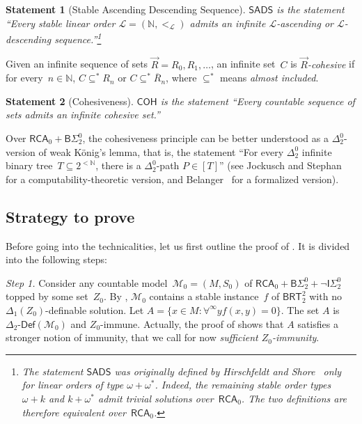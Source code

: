 \documentclass{article}
\def\L{\mathcal{L}}
\def\M{\mathcal{M}}
\newcommand{\ISig}{\mathsf{I}\Sigma^0}
\newcommand{\BSig}{\mathsf{B}\Sigma^0}
\newcommand{\RCA}[0]{\mathsf{RCA}}
\newcommand{\SADS}[0]{\mathsf{SADS}}
\newcommand{\COH}[0]{\mathsf{COH}}
\newcommand{\BRT}[0]{\mathsf{BRT}}
\newcommand{\NN}[0]{\mathbb{N}}
\newcommand{\Definable}[2]{#1\mbox{-}\mathsf{Def}(#2)}
\def\qt#1{``#1''}%
\newtheorem*{statement}{Statement}
\numberwithin{theorem}{section}
\begin{document}
\begin{statement}[Stable Ascending Descending Sequence]
$\SADS$ is the statement \qt{Every stable linear order $\L = (\NN, <_\L)$ admits an infinite $\L$-ascending or $\L$-descending sequence.}\footnote{The statement $\SADS$ was originally defined by Hirschfeldt and Shore~\cite{hirschfeldt_combinatorial_2007} only for linear orders of type $\omega+\omega^*$. Indeed, the remaining stable order types $\omega+k$ and $k+\omega^*$ admit trivial solutions over~$\RCA_0$. The two definitions are therefore equivalent over~$\RCA_0$.}
\end{statement}

Given an infinite sequence of sets $\vec{R} = R_0, R_1, \dots$, an infinite set~$C$ is \emph{$\vec{R}$-cohesive}
if for every~$n \in \NN$, $C \subseteq^* R_n$ or $C \subseteq^* \overline{R}_n$, where $\subseteq^*$ means \emph{almost included}.

\begin{statement}[Cohesiveness]
$\COH$ is the statement \qt{Every countable sequence of sets admits an infinite cohesive set.}
\end{statement}

Over $\RCA_0 + \BSig_2$, the cohesiveness principle can be better understood as a $\Delta^0_2$-version of weak K\"onig's lemma, that is, the statement \qt{For every $\Delta^0_2$ infinite binary tree~$T \subseteq 2^{<\NN}$, there is a $\Delta^0_2$-path $P \in [T]$} (see Jockusch and Stephan~\cite{jockusch1993cohesive} for a computability-theoretic version, and Belanger~\cite{belanger_conservation_2015} for a formalized version).

\subsection{Strategy to prove }

Before going into the technicalities, let us first outline the proof of .
It is divided into the following steps:
\smallskip

\noindent
\emph{Step 1.}
Consider any countable model~$\M_0 = (M, S_0)$ of $\RCA_0 + \BSig_2 + \neg \ISig_2$ topped by some set~$Z_0$. By , $\M_0$ contains a stable instance~$f$ of $\BRT^2_2$ with no $\Delta_1(Z_0)$-definable solution. Let $A = \{ x \in M : \forall^\infty y f(x, y) = 0 \}$. The set $A$ is $\Definable{\Delta_2}{\M_0}$ and $Z_0$-immune. Actually, the proof of  shows that $A$ satisfies a stronger notion of immunity, that we call for now \emph{sufficient $Z_0$-immunity}. 
\smallskip
\end{document}
